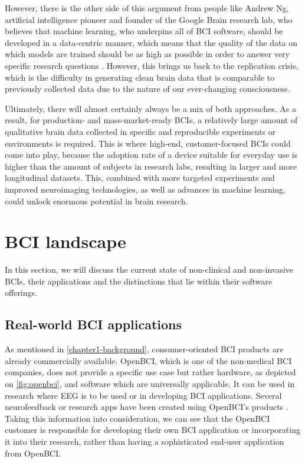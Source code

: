 However, there is the other side of this argument from people like Andrew Ng, artificial intelligence pioneer and founder of the Google Brain research lab, who believes that machine learning, who underpins all of BCI software, should be developed in a data-centric manner, which means that the quality of the data on which models are trained should be as high as possible in order to answer very specific research questions \citep{brown_why_2022}. However, this brings us back to the replication crisis, which is the difficulty in generating clean brain data that is comparable to previously collected data due to the nature of our ever-changing consciousness. 

Ultimately, there will almost certainly always be a mix of both approaches. As a result, for production- and mass-market-ready BCIs, a relatively large amount of qualitative brain data collected in specific and reproducible experiments or environments is required. This is where high-end, customer-focused BCIs could come into play, because the adoption rate of a device suitable for everyday use is higher than the amount of subjects in research labs, resulting in larger and more longitudinal datasets. This, combined with more targeted experiments and improved neuroimaging technologies, as well as advances in machine learning, could unlock enormous potential in brain research.

\section{BCI landscape}
\label{chapter2-research-landscape}

In this section, we will discuss the current state of non-clinical and non-invasive BCIs, their applications and the distinctions that lie within their software offerings.

\subsection{Real-world BCI applications}
\label{chapter2-real-world-bci-applications}

As mentioned in \autoref{chapter1-background}, consumer-oriented BCI products are already commercially available. OpenBCI, which is one of the non-medical BCI companies, does not provide a specific use case but rather hardware, as depicted on \autoref{fig:openbci}, and software which are universally applicable. It can be used in research where EEG is to be used or in developing BCI applications. Several neurofeedback or research apps have been created using OpenBCI's products \citep{openbci_openbci_nodate}. Taking this information into consideration, we can see that the OpenBCI customer is responsible for developing their own BCI application or incorporating it into their research, rather than having a sophisticated end-user application from OpenBCI.

